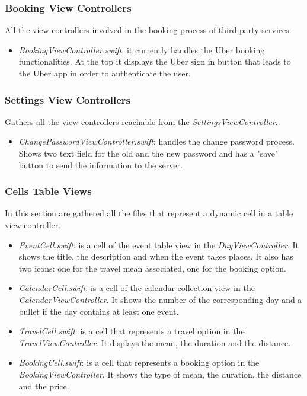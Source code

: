 \subsubsection*{Booking View Controllers}
All the view controllers involved in the booking process of third-party services.
\begin{itemize}
	\item \textit{BookingViewController.swift}: it currently handles the Uber booking functionalities. At the top it displays the Uber sign in button that leads to the Uber app in order to authenticate the user.
\end{itemize}

\subsubsection*{Settings View Controllers}
Gathers all the view controllers reachable from the \textit{SettingsViewController}.
\begin{itemize}
	\item \textit{ChangePasswordViewController.swift}: handles the change password process. Shows two text field for the old and the new password and has a "save" button to send the information to the server. 
\end{itemize}

\subsubsection*{Cells Table Views}
In this section are gathered all the files that represent a dynamic cell in a table view controller.
\begin{itemize}
	\item \textit{EventCell.swift}: is a cell of the event table view in the \textit{DayViewController}. It shows the title, the description and when the event takes places. It also has two icons: one for the travel mean associated, one for the booking option.
	\item \textit{CalendarCell.swift}: is a cell of the calendar collection view in the \textit{CalendarViewController}. It shows the number of the corresponding day and a bullet if the day contains at least one event.
	\item \textit{TravelCell.swift}: is a cell that represents a travel option in the \textit{TravelViewController}. It displays the mean, the duration and the distance. 
	\item \textit{BookingCell.swift}: is a cell that represents a booking option in the \textit{BookingViewController}. It shows the type of mean, the duration, the distance and the price.
\end{itemize}

